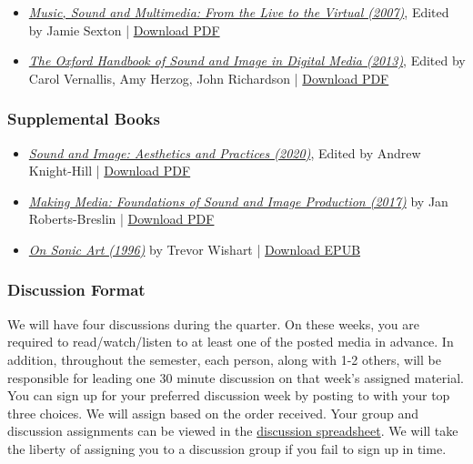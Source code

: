 \begin{itemize}
      \tightlist
      \item \emph{\href{https://books.google.com/books?id=j-iqBgAAQBAJ&newbks=1&newbks_redir=0&source=gbs_navlinks_s}{Music, Sound and Multimedia: From the Live to the Virtual (2007)}}, Edited by Jamie Sexton | \href{supplements/Music_Sound_and_Multimedia_-_From_the_Live_to_the_Virtual_(Music_and_the_Moving_Image)_(2008).pdf}{Download PDF}
      \item \emph{\href{https://books.google.com/books/about/The_Oxford_Handbook_of_Sound_and_Image_i.html?id=XWHSAQAAQBAJ}{The Oxford Handbook of Sound and Image in Digital Media (2013)}}, Edited by Carol Vernallis, Amy Herzog, John Richardson | \href{supplements/The_Oxford_Handbook_of_Sound_and_Image_in_Digital_Media_(2013).pdf}{Download PDF}
\end{itemize}

\subsubsection{Supplemental Books}

\begin{itemize}
      \tightlist
      \item \emph{\href{https://books.google.com/books/about/Sound_and_Image.html?id=-wpUzQEACAAJ}{Sound and Image: Aesthetics and Practices (2020)}}, Edited by Andrew Knight-Hill | \href{supplements/Sound_and_Image_-_Aesthetics_and_Practices_(Sound_Design)_(2020).pdf}{Download PDF}
      \item \emph{\href{https://books.google.com/books?id=aGYPEAAAQBAJ&newbks=1&newbks_redir=0&source=gbs_navlinks_s}{Making Media: Foundations of Sound and Image Production (2017)}} by Jan Roberts-Breslin | \href{supplements/Making_Media_-_Foundations_of_Sound_and_Image_Production_(2003).pdf}{Download PDF}
      \item \emph{\href{https://books.google.com/books?id=KbYyDQAAQBAJ&dq=On_Sonic_Art_(Contemporary_Music_Studies)_(2002)&source=gbs_navlinks_s}{On Sonic Art (1996)}} by Trevor Wishart | \href{supplements/On_Sonic_Art_(Contemporary_Music_Studies)_(2002).epub}{Download EPUB}
\end{itemize}

\subsubsection{Discussion Format}

We will have four discussions during the quarter. On these weeks, you are required to read/watch/listen to at least one of the posted media in advance. In addition, throughout the semester, each person, along with 1-2 others, will be responsible for leading one 30 minute discussion on that week's assigned material. You can sign up for your preferred discussion week by posting to  with your top three choices. We will assign based on the order received. Your group and discussion assignments can be viewed in the \href{https://docs.google.com/spreadsheets/d/1Fw-DHUMtnCnlHasDcXCUGjx8n23QxS_RaPrshLq49R0/edit?usp=sharing}{discussion spreadsheet}. We will take the liberty of assigning you to a discussion group if you fail to sign up in time.

